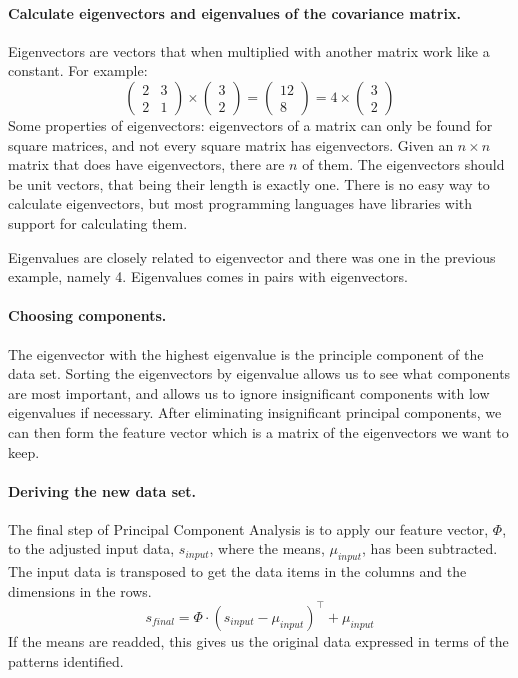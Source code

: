 \paragraph{Calculate eigenvectors and eigenvalues of the covariance matrix.}
Eigenvectors are vectors that when multiplied with another matrix work like a constant. For example:
$$
\begin{pmatrix}
2 & 3 \\
2 & 1
\end{pmatrix}
\times
\begin{pmatrix}
3\\
2
\end{pmatrix}
=
\begin{pmatrix}
12 \\
8
\end{pmatrix}
=
4 \times
\begin{pmatrix}
3 \\
2
\end{pmatrix}
$$
Some properties of eigenvectors: eigenvectors of a matrix can only be found for square matrices, and not every square matrix has eigenvectors. 
Given an $n\times n$ matrix that does have eigenvectors, there are $n$ of them.
The eigenvectors should be unit vectors, that being their length is exactly one.
There is no easy way to calculate eigenvectors, but most programming languages have libraries with support for calculating them.

Eigenvalues are closely related to eigenvector and there was one in the previous example, namely 4.
Eigenvalues comes in pairs with eigenvectors.

\paragraph{Choosing components.}
The eigenvector with the highest eigenvalue is the principle component of the data set.
Sorting the eigenvectors by eigenvalue allows us to see what components are most important, and allows us to ignore insignificant components with low eigenvalues if necessary.
After eliminating insignificant principal components, we can then form the feature vector which is a matrix of the eigenvectors we want to keep.


\paragraph{Deriving the new data set.}
The final step of Principal Component Analysis is to apply our feature vector, $\Phi$, to the adjusted input data, $s_{input}$, where the means, $\mu_{input}$, has been subtracted.
The input data is transposed to get the data items in the columns and the dimensions in the rows.
$$s_{final} = \Phi\cdot (s_{input}-\mu_{input})^\top+\mu_{input} $$ %
If the means are readded, this gives us the original data expressed in terms of the patterns identified.

